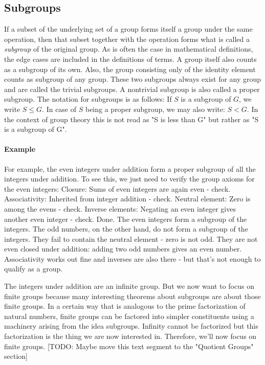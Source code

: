 \subsection{Subgroups}
If a subset of the underlying set of a group forms itself a group under the same operation, then that subset together with the operation forms what is called a \emph{subgroup} of the original group. As is often the case in mathematical definitions, the edge cases are included in the definitions of terms. A group itself also counts as a subgroup of its own. Also, the group consisting only of the identity element counts as subgroup of any group. These two subgroups always exist for any group and are called the trivial subgroups. A nontrivial subgroup is also called a proper subgroup. The notation for subgroups is as follows: If $S$ is a subgroup of $G$, we write $S \leq G$. In case of $S$ being a proper subgroup, we may also write: $S < G$. In the context of group theory this is not read as "S is less than G" but rather as "S is a subgroup of G".


\paragraph{Example}
For example, the even integers under addition form a proper subgroup of all the integers under addition. To see this, we just need to verify the group axioms for the even integers: Closure: Sums of even integers are again even - check. Associativity: Inherited from integer addition - check. Neutral element: Zero is among the evens - check. Inverse elements: Negating an even integer gives another even integer - check. Done. The even integers form a subgroup of the integers. The odd numbers, on the other hand, do not form a subgroup of the integers. They fail to contain the neutral element - zero is not odd. They are not even closed under addition: adding two odd numbers gives an even number. Associativity works out fine and inverses are also there - but that's not enough to qualify as a group. 

\medskip
The integers under addition are an infinite group. But we now want to focus on finite groups because many interesting theorems about subgroups are about those finite groups. In a certain way that is analogous to the prime factorization of natural numbers, finite groups can be factored into simpler constituents using a machinery arising from the idea subgroups. Infinity cannot be factorized but this factorization is the thing we are now interested in. Therefore, we'll now focus on finite groups. [TODO: Maybe move this text segment to the "Quotient Groups" section]

